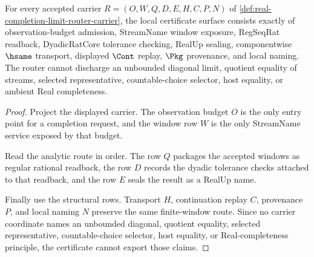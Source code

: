 \begin{theorem}
\label{thm:real-completion-limit-router-namecert-obligations}
For every accepted carrier $R=(O,W,Q,D,E,H,C,P,N)$ of \autoref{def:real-completion-limit-router-carrier}, the local certificate surface consists exactly of observation-budget admission, StreamName window exposure, RegSeqRat readback, DyadicRatCore tolerance checking, RealUp sealing, componentwise $\hsame$ transport, displayed $\Cont$ replay, $\Pkg$ provenance, and local naming. The router cannot discharge an unbounded diagonal limit, quotient equality of streams, selected representative, countable-choice selector, host equality, or ambient Real completeness.
\end{theorem}
\begin{proof}
Project the displayed carrier. The observation budget $O$ is the only entry point for a completion request, and the window row $W$ is the only StreamName service exposed by that budget.

Read the analytic route in order. The row $Q$ packages the accepted windows as regular rational readback, the row $D$ records the dyadic tolerance checks attached to that readback, and the row $E$ seals the result as a RealUp name.

Finally use the structural rows. Transport $H$, continuation replay $C$, provenance $P$, and local naming $N$ preserve the same finite-window route. Since no carrier coordinate names an unbounded diagonal, quotient equality, selected representative, countable-choice selector, host equality, or Real-completeness principle, the certificate cannot export those claims.
\end{proof}

